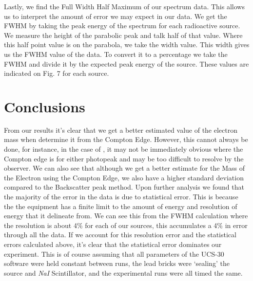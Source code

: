 \documentclass[%
 reprint,
 amsmath,amssymb,
 aps,
]{revtex4-1}
\begin{document}
Lastly, we find the Full Width Half Maximum of our spectrum data. This allows us to interpret the amount of error we may expect in our data. We get the FWHM by taking the peak energy of the spectrum for each radioactive source. We measure the height of the parabolic peak and talk half of that value. Where this half point value is on the parabola, we take the width value. This width gives us the FWHM value of the data. To convert it to a percentage we take the FWHM and divide it by the expected peak energy of the source. These values are indicated on Fig. 7 for each source.



\section{\label{sec:level1}Conclusions}
From our results it's clear that we get a better estimated value of the electron mass when determine it from the Compton Edge. However, this cannot always be done, for instance, in the case of \co, it may not be immediately obvious where the Compton edge is for either photopeak and may be too difficult to resolve by the observer. We can also see that although we get a better estimate for the Mass of the Electron using the Compton Edge, we also have a higher standard deviation compared to the Backscatter peak method. Upon further analysis we found that the majority of the error in the data is due to statistical error. This is because the the equipment has a finite limit to the amount of energy and resolution of energy that it delineate from. We can see this from the FWHM calculation where the resolution is about 4\% for each of our sources, this accumulates a 4\% in error through all the data. If we account for this resolution error and the statistical errors calculated above, it's clear that the statistical error dominates our experiment. This is of course assuming that all parameters of the UCS-30 software were held constant between runs, the lead bricks were `sealing' the source and \textit{NaI} Scintillator, and the experimental runs were all timed the same.
\end{document}
